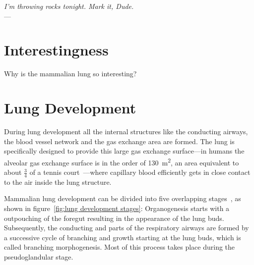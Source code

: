 \label{ch:lung}
\begin{flushright}{\slshape I'm throwing rocks tonight. Mark it, Dude.} \\ \medskip
    ---  \citep{TheBigLebowski}
\end{flushright}
\bigskip
\section{Interestingness}
Why is the mammalian lung so interesting?

\section{Lung Development}
During lung development all the internal structures like the conducting airways, the blood vessel network and the gas exchange area are formed. The lung is specifically designed to provide this large gas exchange surface---in humans the alveolar gas exchange surface is in the order of \SI{130}{\meter\squared}, an area equivalent to about $\frac{3}{4}$ of a tennis court~\cite{Weibel2009}---where capillary blood efficiently gets in close contact to the air inside the lung structure. 

Mammalian lung development can be divided into five overlapping stages~\cite{Schittny2004}, as shown in figure~\ref{fig:lung development stages}: Organogenesis starts with a outpouching of the foregut resulting in the appearance of the lung buds. Subsequently, the conducting and parts of the respiratory airways are formed by a successive cycle of branching and growth starting at the lung buds, which is called branching morphogenesis. Most of this process takes place during the pseudoglandular stage.

